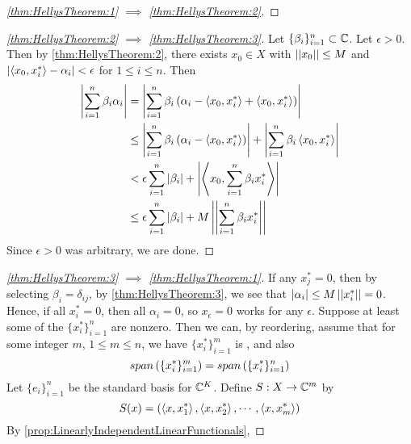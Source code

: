 \begin{thm}
\begin{proof}[\ref{thm:HellysTheorem:1} $\implies$ \ref{thm:HellysTheorem:2}]
    \end{proof}
    \begin{proof}[\ref{thm:HellysTheorem:2} $\implies$ \ref{thm:HellysTheorem:3}]
        Let $\{\beta_i\}_{i=1}^n \subset \mathbb{C}$.
        Let $\epsilon > 0$. 
        Then by \ref{thm:HellysTheorem:2}, there exists 
        $x_{0} \in X$ with $\left|\left| x_0 \right|\right| \leq M$ and 
        $\left| \left\langle x_0, x_i^* \right\rangle -\alpha_i \right| < \epsilon$ for $1 \leq i \leq n$. 
        Then
        \begin{align*}
        \left| \sum\limits_{i=1}^n \beta_i \alpha_i \right| 
        & = \left| \sum\limits_{i=1}^n \beta_i \left( \alpha_i - \left\langle x_0, x_i^* \right\rangle+\left\langle x_0, x_i^* \right\rangle\right) \right|\\
        & \leq \left| \sum\limits_{i=1}^n \beta_i \left( \alpha_i - \left\langle x_0, x_i^* \right\rangle\right) \right|
        + \left| \sum\limits_{i=1}^n  \beta_i \left\langle x_0, x_i^* \right\rangle \right|\\
        & < \epsilon \sum\limits_{i=1}^n \left| \beta_i \right| 
        + \left|  \left\langle x_0, \sum\limits_{i=1}^n \beta_ix_i^* \right\rangle \right|\\
        & \leq \epsilon \sum\limits_{i=1}^n \left| \beta_i \right| 
        + M \left|\left| \sum\limits_{i=1}^n \beta_i x_i^* \right|\right|
        \end{align*}
        Since $\epsilon > 0$ was arbitrary, we are done.
    \end{proof} 
    \begin{proof}[\ref{thm:HellysTheorem:3} $\implies$ \ref{thm:HellysTheorem:1}]
        If any $x_j^*=0$, then by selecting $\beta_i= \delta_{ij}$, 
        by \ref{thm:HellysTheorem:3}, we see that $\left| \alpha_i \right| \leq M \left|\left| x_i^* \right|\right| =0$. 
        Hence, if all $x_i^*=0$, 
        then all $\alpha_i = 0$, so 
        $x_\epsilon = 0$ works for any $\epsilon$. 
        Suppose at least some of the $\{x_i^*\}_{i=1}^n$ are nonzero.
        Then we can, by reordering, assume that for some integer $m$, 
        $1 \leq m \leq n$, we have 
        $\{x_i^*\}_{i=1}^m$ is
        \LinearlyIndependent,
        and also 
        \begin{equation}
        \label{Eq:HellysTheorem:1}
        span \left( \{x_i^*\}_{i=1}^m\right)= span \left( \{x_i^*\}_{i=1}^n\right)
        \end{equation}
        Let $\{e_i\}_{i=1}^n$ be the standard basis for $\mathbb{C}^K$. 
        Define $S:X \to \mathbb{C}^m$ by 
        \begin{equation*}
        S(x) = \left( \left\langle x, x_1^* \right\rangle, \left\langle x, x_2^* \right\rangle, \cdots, \left\langle x, x_m^* \right\rangle\right)
        \end{equation*}
        By \ref{prop:LinearlyIndependentLinearFunctionals}, 

\end{proof}
\end{thm}

